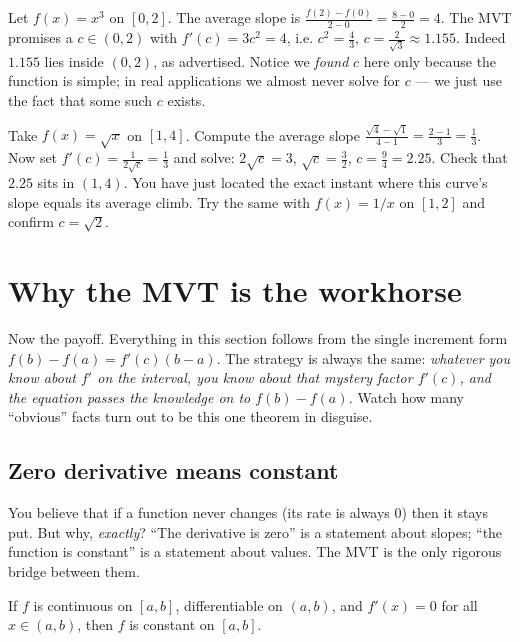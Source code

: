 \begin{example}\label{ch15:ex-find-c}
Let $f(x)=x^3$ on $[0,2]$. The average slope is
$\frac{f(2)-f(0)}{2-0}=\frac{8-0}{2}=4$. The MVT promises a $c\in(0,2)$ with
$f'(c)=3c^2=4$, i.e. $c^2=\frac43$, $c=\frac{2}{\sqrt3}\approx 1.155$. Indeed
$1.155$ lies inside $(0,2)$, as advertised. Notice we \emph{found} $c$ here only
because the function is simple; in real applications we almost never solve for $c$
--- we just use the fact that some such $c$ exists.
\end{example}

\begin{labbox}
Take $f(x)=\sqrt{x}$ on $[1,4]$. Compute the average slope
$\frac{\sqrt4-\sqrt1}{4-1}=\frac{2-1}{3}=\frac13$. Now set $f'(c)=\frac{1}{2\sqrt
c}=\frac13$ and solve: $2\sqrt c=3$, $\sqrt c=\frac32$, $c=\frac94=2.25$. Check that
$2.25$ sits in $(1,4)$. You have just located the exact instant where this curve's
slope equals its average climb. Try the same with $f(x)=1/x$ on $[1,2]$ and confirm
$c=\sqrt2$.
\end{labbox}

\section{Why the MVT is the workhorse}

Now the payoff. Everything in this section follows from the single increment form
$f(b)-f(a)=f'(c)(b-a)$. The strategy is always the same: \emph{whatever you know
about $f'$ on the interval, you know about that mystery factor $f'(c)$, and the
equation passes the knowledge on to $f(b)-f(a)$.} Watch how many ``obvious'' facts
turn out to be this one theorem in disguise.

\subsection{Zero derivative means constant}

You believe that if a function never changes (its rate is always $0$) then it stays
put. But why, \emph{exactly}? ``The derivative is zero'' is a statement about
slopes; ``the function is constant'' is a statement about values. The MVT is the
only rigorous bridge between them.

\begin{theorem}\label{ch15:thm-const}
If $f$ is continuous on $[a,b]$, differentiable on $(a,b)$, and $f'(x)=0$ for all
$x\in(a,b)$, then $f$ is constant on $[a,b]$.
\end{theorem}

